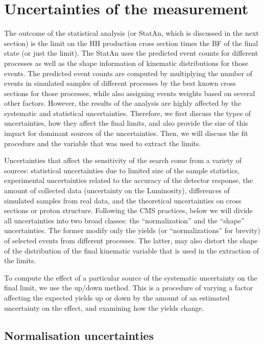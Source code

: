 \section{Uncertainties of the measurement}
\label{sec:Systematics}

The outcome of the statistical analysis (or StatAn, which is discussed in the next section) is the limit on the HH production cross section times the BF of the final state (or just the limit). The StatAn uses the predicted event counts for different processes as well as the shape information of kinematic distributions for those events. The predicted event  counts are computed by multiplying the number of events in simulated samples of different processes by the best known cross sections for those processes, while also assigning events weights based on several other factors. However, the results of the analysis are highly affected by the systematic and statistical uncertainties. Therefore, we first discuss the types of uncertainties, how they affect the final limits, and also provide the size of this impact for dominant sources of the uncertainties. Then, we will discuss the fit procedure and the variable that was used to extract the limits. 

Uncertainties that affect the sensitivity of the search come from a variety of sources: statistical uncertainties due to limited size of the sample statistics, experimental uncertainties related to the accuracy of the detector response, the amount of collected data (uncertainty on the Luminosity), differences of simulated samples from real data, and the theoretical uncertainties on cross sections or proton structure. Following the CMS practices, below we will divide all uncertainties into two broad classes: the ``normalization'' and the ``shape''  uncertainties. The former modify only the yields (or ``normalizations'' for brevity) of selected events from different processes. The latter, may also distort the shape of the distribution of the final kinematic variable that is used in the extraction of the limits.

To compute the effect of a particular source of the systematic uncertainty on the final limit, we use the up/down method. This is a procedure of varying a factor affecting the expected yields up or down by the amount of an estimated uncertainty on the effect, and examining how the yields change.
 
\subsection{Normalisation uncertainties}

